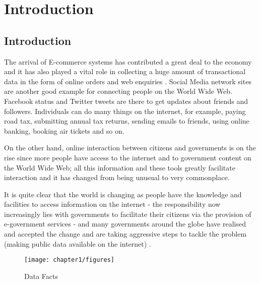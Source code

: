 
\chapter{Introduction} %

\label{Chapter1} %



\section{Introduction}

The arrival of E-commerce systems has contributed a great deal to the economy and it has also played a vital role in collecting a huge amount of transactional data in the form of online orders and web enquiries \cite{ons}. Social Media network sites are another good example for connecting people on the World Wide Web. Facebook status and Twitter tweets are there to get updates about friends and followers. Individuals can do many things on the internet, for example, paying road tax, submitting annual tax returns, sending emails to friends, using online banking, booking air tickets and so on.

On the other hand, online interaction between citizens and governments is on the rise since more people have access to the internet and to government content on the World Wide Web; all this information and these tools greatly facilitate interaction and it has changed from being unusual to very commonplace. 

It is quite clear that the world is changing as people have the knowledge and facilities to access information on the internet - the responsibility now increasingly lies with governments to facilitate their citizens via the provision of e-government services - and many governments around the globe have realised and accepted the change and are taking aggressive steps to tackle the problem (making public data available on the internet) \cite{colesca2015understanding}.

\begin{figure}[H]
\centering
\texttt{[image: chapter1/figures]}
\caption{Data Facts \cite{ons}}
\end{figure}

